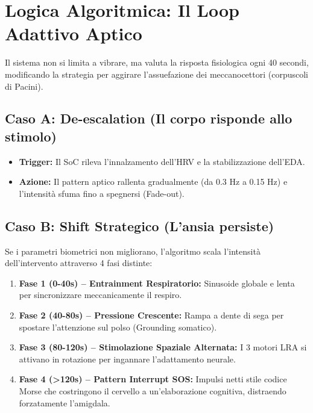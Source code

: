 \documentclass[12pt,a4paper]{article}
\begin{document}
\section{Logica Algoritmica: Il Loop Adattivo Aptico}
Il sistema non si limita a vibrare, ma valuta la risposta fisiologica ogni 40 secondi, modificando la strategia per aggirare l'assuefazione dei meccanocettori (corpuscoli di Pacini).

\subsection{Caso A: De-escalation (Il corpo risponde allo stimolo)}
\begin{itemize}
    \item \textbf{Trigger:} Il SoC rileva l'innalzamento dell'HRV e la stabilizzazione dell'EDA.
    \item \textbf{Azione:} Il pattern aptico rallenta gradualmente (da 0.3 Hz a 0.15 Hz) e l'intensità sfuma fino a spegnersi (Fade-out).
\end{itemize}

\subsection{Caso B: Shift Strategico (L'ansia persiste)}
Se i parametri biometrici non migliorano, l'algoritmo scala l'intensità dell'intervento attraverso 4 fasi distinte:
\begin{enumerate}
    \item \textbf{Fase 1 (0-40s) -- Entrainment Respiratorio:} Sinusoide globale e lenta per sincronizzare meccanicamente il respiro.
    \item \textbf{Fase 2 (40-80s) -- Pressione Crescente:} Rampa a dente di sega per spostare l'attenzione sul polso (Grounding somatico).
    \item \textbf{Fase 3 (80-120s) -- Stimolazione Spaziale Alternata:} I 3 motori LRA si attivano in rotazione per ingannare l'adattamento neurale.
    \item \textbf{Fase 4 (>120s) -- Pattern Interrupt SOS:} Impulsi netti stile codice Morse che costringono il cervello a un'elaborazione cognitiva, distraendo forzatamente l'amigdala.
\end{enumerate}
\end{document}
